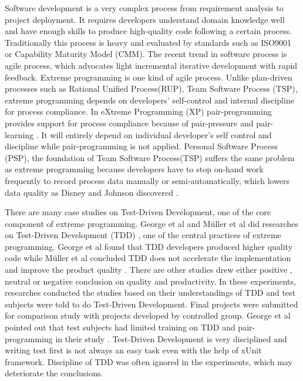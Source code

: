 \documentclass[11pt,twocolumn]{article}
\begin{document}
\label{sec:intro}
Software development is a very complex process from requirement analysis to
project deployment. It requires developers understand domain knowledge well
and have enough skills to produce high-quality code following a certain
process. Traditionally this process is heavy and evaluated by standards
such as ISO9001 or Capability Maturity Model (CMM). The recent trend in
software process is agile process, which advocates light incremental
iterative development with rapid feedback. Extreme programming
\cite{Beck:00} is one kind of agile process. Unlike plan-driven processes
such as Rational Unified Process(RUP), Team Software Process (TSP), extreme
programming depends on developers' self-control and internal discipline for
process compliance.  In eXtreme Programming (XP) pair-programming provides
support for process compliance because of pair-pressure and pair-learning
\cite{Williams:00}.  It will entirely depend on individual developer's self
control and discipline while pair-programming is not applied. Personal
Software Process (PSP), the foundation of Team Software Process(TSP)
\cite{Humphrey:99} suffers the same problem as extreme programming because
developers have to stop on-hand work frequently to record process data
manually or semi-automatically, which lowers data quality as Disney and
Johnson discovered \cite{csdl-98-04}.

There are many case studies on Test-Driven Development, one of the core
component of extreme programming. George et al \cite{George:04} and
M\"uller \cite{Muller:02} et al did researches on Test-Driven Development
(TDD) \cite{Beck:03}, one of the central practices of extreme programming.
George et al found that TDD developers produced higher quality code
\cite{George:04} while M\"uller et al concluded TDD does not accelerate the
implementation and improve the product quality \cite{Muller:02}. There are
other studies drew either positive \cite{Olan:03,Edwards:04}, neutral
\cite{Geras:04} or negative \cite{Matjaz:03} conclusion on quality and
productivity. In these experiments, researches conducted the studies based
on their understandings of TDD and test subjects were told to do
Test-Driven Development. Final projects were submitted for comparison study
with projects developed by controlled group.  George et al pointed out that
test subjects had limited training on TDD and pair-programming in their
study \cite{George:04}. Test-Driven Development is very disciplined and
writing test first is not always an easy task even with the help of xUnit
\cite{Beck:03} framework. Discipline of TDD was often ignored in the
experiments, which may deteriorate the conclusions.
\end{document}
